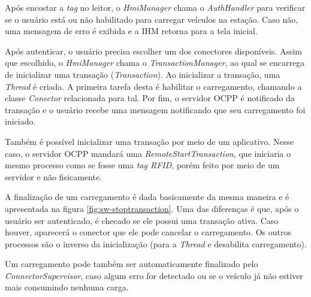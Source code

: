       Após encostar a \textit{tag} no leitor, o \textit{HmiManager} chama o \textit{AuthHandler} para verificar se o usuário está ou não habilitado para carregar veículos na estação. Caso não, uma mensagem de erro é exibida e a \ac{IHM} retorna para a tela inicial.

      Após autenticar, o usuário precisa escolher um dos conectores disponíveis. Assim que escolhido, o \textit{HmiManager} chama o \textit{TransactionManager}, ao qual se encarrega de inicializar uma transação (\textit{Transaction}). Ao inicializar a transação, uma \textit{Thread} é criada. A primeira tarefa desta é habilitar o carregamento, chamando a classe \textit{Conector} relacionada para tal. Por fim, o servidor \ac{OCPP} é notificado da transação e o usuário recebe uma mensagem notificando que seu carregamento foi iniciado.

      Também é possível inicializar uma transação por meio de um aplicativo. Nesse caso, o servidor OCPP mandará uma \textit{RemoteStartTransaction}, que iniciaria o mesmo processo como se fosse uma \textit{tag RFID}, porém feito por meio de um servidor e não fisicamente.

      A finalização de um carregamento é dada basicamente da mesma maneira e é apresentada na figura \ref{fig:sw-stoptransaction}. Uma das diferenças é que, após o usuário ser autenticado, é checado se ele possui uma transação ativa. Caso houver, aparecerá o conector que ele pode cancelar o carregamento. Os outros processos são o inverso da inicialização (para a \textit{Thread} e desabilita carregamento).

      Um carregamento pode também ser automaticamente finalizado pelo \textit{ConnectorSupervisor}, caso algum erro for detectado ou se o veículo já não estiver mais consumindo nenhuma carga.

